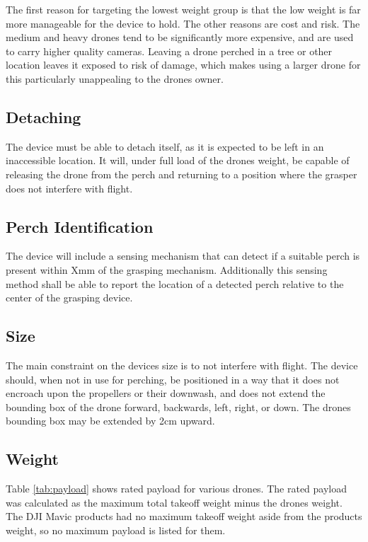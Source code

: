 The first reason for targeting the lowest weight group is that the low weight is far more
manageable for the device to hold. 
The other reasons are cost and risk. The medium and heavy drones tend to be significantly 
more expensive, and are used to carry higher quality cameras. Leaving a drone perched in a tree or other location leaves
it exposed to risk of damage, which makes using a larger drone for this particularly unappealing to the drones owner.

\subsection{Detaching}

The device must be able to detach itself, as it is expected to be left in an inaccessible location. It will, under full
load of the drones weight, be capable of releasing the drone from the perch and returning to a position where the grasper
does not interfere with flight.

\subsection{Perch Identification}

The device will include a sensing mechanism that can detect if a suitable perch is present within Xmm
of the grasping mechanism. Additionally this sensing method shall be able to report the location
of a detected perch relative to the center of the grasping device.

\subsection{Size}

The main constraint on the devices size is to not interfere with flight. The device should, when not in use for perching,
be positioned in a way that it does not encroach upon the propellers or their downwash, and does not extend the bounding box
of the drone forward, backwards, left, right, or down. The drones bounding box may be extended by 2cm upward. 
 
\subsection{Weight}

Table \ref{tab:payload} shows rated payload for various drones. The rated payload was calculated as the maximum total takeoff weight minus the drones weight. The DJI Mavic products had no maximum takeoff weight aside from 
the products weight, so no maximum payload is listed for them. 

